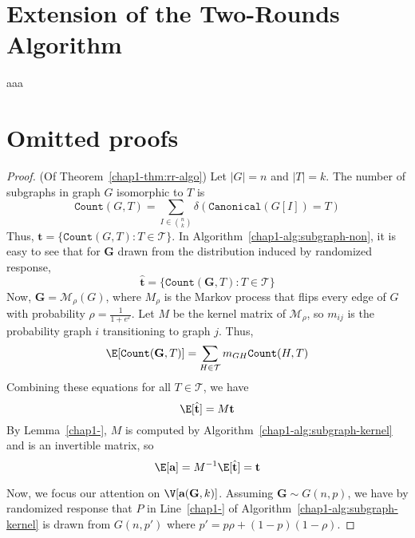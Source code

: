 \appendix

\section{Extension of the Two-Rounds Algorithm}
\label{chap1-sec:modified_two_rounds}
aaa

\section{Omitted proofs}
\begin{proof}(Of Theorem~\ref{chap1-thm:rr-algo})
  Let $|G| = n$ and $|T|=k$.
  The number of subgraphs in graph $G$ isomorphic to $T$ is
  \[
    \texttt{Count}(G,T) = 
    \sum_{I \in {n \choose k}} \delta(\texttt{Canonical}(G[I]) = T)
  \]
  Thus, $\textbf{t} = \{\texttt{Count}(G,T) : T \in \mathcal{T}\}$.
  In Algorithm~\ref{chap1-alg:subgraph-non}, it is easy to see that for $\textbf{G}$ 
  drawn from the distribution induced by randomized response,
  \[
    \hat{\textbf{t}} = \{\texttt{Count}(\textbf{G},T) : T \in \mathcal{T}\}
  \]
  Now, $\textbf{G} = \mathcal{M}_\rho(G)$, where $M_\rho$ is the Markov process that flips
  every edge of $G$ with probability $\rho = \frac{1}{1+e^{\varepsilon}}$. Let
  $M$ be the kernel matrix of $\mathcal{M}_\rho$, so $m_{ij}$ is the probability graph $i$
  transitioning to graph $j$. Thus,
  \[
    \E[\texttt{Count}(\textbf{G},T)] = \sum_{H \in \mathcal{T}} m_{GH}
    \texttt{Count}(H,T)
  \]
  Combining these equations for all $T \in \mathcal{T}$, we have
  \[
    \E[\hat{\textbf{t}}] = M \textbf{t}
  \]
  By Lemma~\ref{chap1-}, $M$ is computed by Algorithm~\ref{chap1-alg:subgraph-kernel} and is an 
  invertible matrix, so
  \[
    \E[\textbf{a}] = M^{-1}\E[\hat{\textbf{t}}] = \textbf{t}
  \]
  
  Now, we focus our attention on $\V[\textbf{a}(\textbf{G}, k)]$. Assuming
  $\textbf{G} \sim G(n,p)$, we have by randomized response that $P$ in
  Line~\ref{chap1-} of Algorithm~\ref{chap1-alg:subgraph-kernel} is drawn from $G(n, p')$
  where $p' = p\rho + (1-p)(1-\rho)$.
\end{proof}
